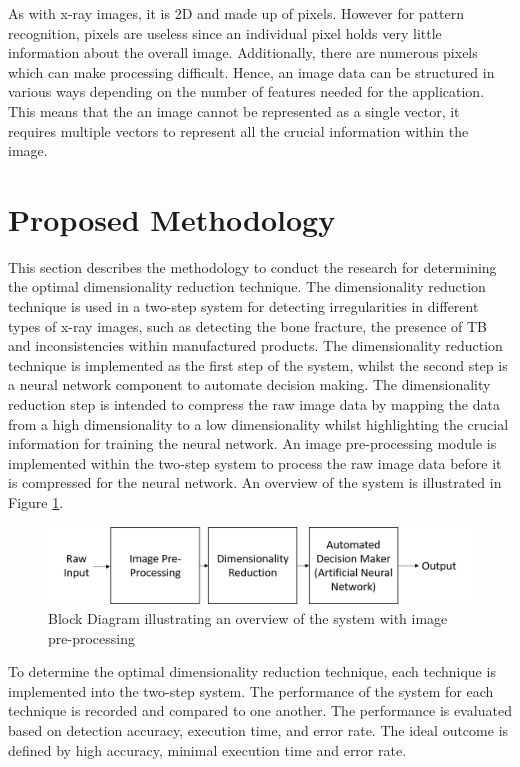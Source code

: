 \documentclass[11pt]{article}
\begin{document}
	As with x-ray images, it is 2D and made up of pixels. However for pattern recognition, pixels are useless since an individual pixel holds very little information about the overall image. Additionally, there are numerous pixels which can make processing difficult. Hence, an image data can be structured in various ways depending on the number of features needed for the application. This means that the an image cannot be represented as a single vector, it requires multiple vectors to represent all the crucial information within the image.
	
	\section{Proposed Methodology}
	\label{sc: Proposed Methodology}
	This section describes the methodology to conduct the research for determining the optimal dimensionality reduction technique. The dimensionality reduction technique is used in a two-step system for detecting irregularities in different types of x-ray images, such as detecting the bone fracture, the presence of TB and inconsistencies within manufactured products. The dimensionality reduction technique is implemented as the first step of the system, whilst the second step is a neural network component to automate decision making. The dimensionality reduction step is intended to compress the raw image data by mapping the data from a high dimensionality to a low dimensionality whilst highlighting the crucial information for training the neural network. An image pre-processing module is implemented within the two-step system to process the raw image data before it is compressed for the neural network. An overview of the system is illustrated in Figure \ref{fig:system overview}.
	
	\begin{figure}[!h]
		\centering
		\includegraphics[scale=0.43]{system_overview_2.png}
		\caption{Block Diagram illustrating an overview of the system with image pre-processing }
		\label{fig:system overview}
	\end{figure}
	
	To determine the optimal dimensionality reduction technique, each technique is implemented into the two-step system. The performance of the system for each technique is recorded and compared to one another. The performance is evaluated based on detection accuracy, execution time, and error rate. The ideal outcome is defined by high accuracy, minimal execution time and error rate.
	
\end{document}
